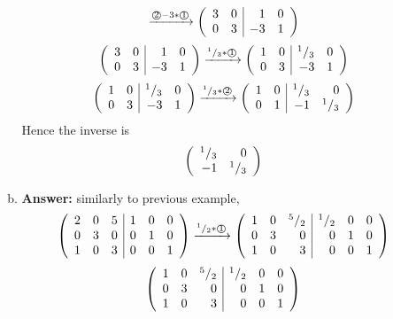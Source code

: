 \documentclass[8pt]{article} %
\begin{document}
\begin{enumerate}[1]
\begin{enumerate}[(a)]
\[				\xrightarrow{\text{\textcircled{2}$-3*$\textcircled{1}}}\left(\begin{array}{rr|rr}
					3&0&1&0\\
					0&3&-3&1\\
				\end{array}\right)
				\]\[\left(\begin{array}{rr|rr}
					3&0&1&0\\
					0&3&-3&1\\
				\end{array}\right)
				\xrightarrow{\text{${^{1}/_{3}}*$\textcircled{1}}}\left(\begin{array}{rr|rr}
					1&0&{^{1}/_{3}}&0\\
					0&3&-3&1\\
				\end{array}\right)
				\]\[\left(\begin{array}{rr|rr}
					1&0&{^{1}/_{3}}&0\\
					0&3&-3&1\\
				\end{array}\right)
				\xrightarrow{\text{${^{1}/_{3}}*$\textcircled{2}}}\left(\begin{array}{rr|rr}
					1&0&{^{1}/_{3}}&0\\
					0&1&-1&{^{1}/_{3}}\\
				\end{array}\right)
				\]
				Hence the inverse is \[\left(\begin{array}{rr}{^{1}/_{3}}&0\\-1&{^{1}/_{3}}\end{array}\right)\]
			\setcounter{enumi}{5}
		\item {\bf Answer: }similarly to previous example,
\[\left(\begin{array}{rrr|rrr}
2&0&5&1&0&0\\
0&3&0&0&1&0\\
1&0&3&0&0&1\\
\end{array}\right)
\xrightarrow{\text{${^{1}/_{2}}*$\textcircled{1}}}\left(\begin{array}{rrr|rrr}
1&0&{^{5}/_{2}}&{^{1}/_{2}}&0&0\\
0&3&0&0&1&0\\
1&0&3&0&0&1\\
\end{array}\right)
\]\[\left(\begin{array}{rrr|rrr}
1&0&{^{5}/_{2}}&{^{1}/_{2}}&0&0\\
0&3&0&0&1&0\\
1&0&3&0&0&1\\
\end{array}\right)
\]
\end{enumerate}
\end{enumerate}
\end{document}
